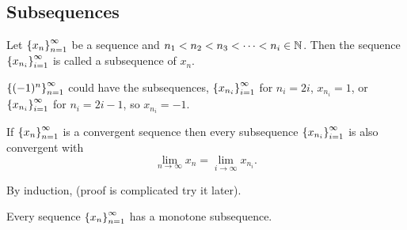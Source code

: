 \documentclass[12pt]{article}
\theoremstyle{definition}
\renewenvironment{proof}[1][\proofname]{\vspace{-10pt}\begin{replacementproof}}{\end{replacementproof}}
\newcommand{\xn}{\set{x_{n}}_{n = 1}^{\infty}}
\begin{document}
    \subsection{Subsequences}

    \begin{definition}[Subsequences]
        Let $\left\{x_n\right\}_{n = 1}^{\infty}$ be a sequence and $n_{1} < n_{2} < n_{3} < \dots < n_{i} \in \mathbb{N}$. Then the sequence $\left\{x_{n_{i}}\right\}_{i = 1}^{\infty}$ is called a subsequence of $x_{n}$.
    \end{definition}

    \begin{eg}
        $\left\{(-1)^{n}\right\}_{n = 1}^{\infty}$ could have the subsequences, $\left\{x_{n_{i}}\right\}_{i = 1}^{\infty}$ for $n_{i} = 2i$, $x_{n_{i}} = 1$, or $\left\{x_{n_{i}}\right\}_{i = 1}^{\infty}$ for $n_{i} = 2i - 1$, so $x_{n_{i}} = -1$.
    \end{eg}

    \begin{prop}
        If $\left\{x_n\right\}_{n = 1}^{\infty}$ is a convergent sequence then every subsequence $\left\{x_{n_{i}}\right\}_{i = 1}^{\infty}$ is also convergent with
        \begin{equation*}
            \lim_{n \rightarrow \infty}x_{n} = \lim_{i \rightarrow \infty}x_{n_{i}}.
        \end{equation*}
    \end{prop}
    \begin{proof}
        By induction, (proof is complicated try it later).
    \end{proof}

    \begin{lemma}\label{peakslemma}
        Every sequence $\xn$ has a monotone subsequence. 
    \end{lemma}
    
\end{document}
